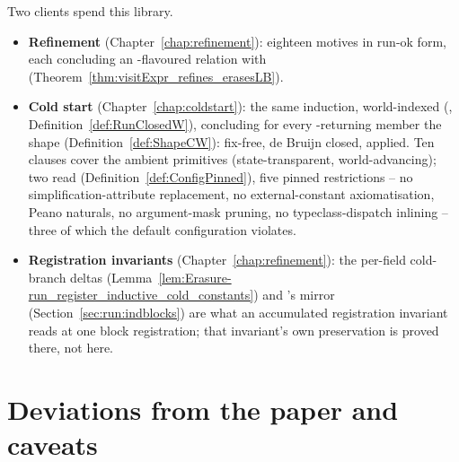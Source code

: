Two clients spend this library.
\begin{itemize}
\item \textbf{Refinement} (Chapter~\ref{chap:refinement}): eighteen motives in run-ok form, each
concluding an \Erases-flavoured relation with 
(Theorem~\ref{thm:visitExpr_refines_erasesLB}).
\item \textbf{Cold start} (Chapter~\ref{chap:coldstart}): the same induction, world-indexed
(, Definition~\ref{def:RunClosedW}), concluding for every \lbox{}-returning member
the shape  (Definition~\ref{def:ShapeCW}): fix-free, de Bruijn closed, applied. Ten
clauses cover the ambient primitives (state-transparent, world-advancing); two read
 (Definition~\ref{def:ConfigPinned}), five pinned restrictions -- no
simplification-attribute replacement, no external-constant axiomatisation, Peano naturals, no
argument-mask pruning, no typeclass-dispatch inlining -- three of which the default 
configuration violates.
\item \textbf{Registration invariants} (Chapter~\ref{chap:refinement}): the per-field cold-branch
deltas (Lemma~\ref{lem:Erasure-run_register_inductive_cold_constants}) and
's mirror (Section~\ref{sec:run:indblocks}) are what an accumulated
registration invariant reads at one block registration; that invariant's own preservation is
proved there, not here.
\end{itemize}

\section{Deviations from the paper and caveats}
\label{sec:run:caveats}

